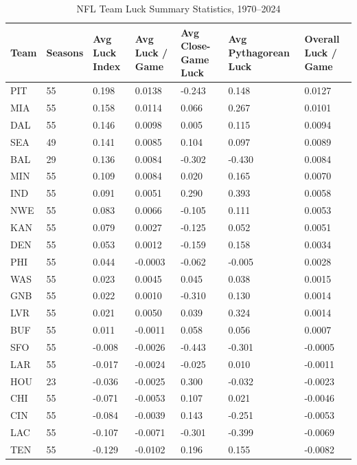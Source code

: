 \documentclass[a4paper,10.5pt,twoside]{article}
\begin{document}
\begin{table}[htbp]
\centering
\caption{NFL Team Luck Summary Statistics, 1970--2024}
\label{tab:luck_summary_stats}
\begin{tabular}{p{1.2cm}p{1.3cm}p{1.8cm}p{1.8cm}p{2.0cm}p{2.2cm}p{1.8cm}}
\hline
\textbf{Team} & \textbf{Seasons} & \textbf{Avg Luck Index} & \textbf{Avg Luck / Game} & \textbf{Avg Close-Game Luck} & \textbf{Avg Pythagorean Luck} & \textbf{Overall Luck / Game} \\
\hline
PIT & 55 & 0.198 & 0.0138 & -0.243 & 0.148 & 0.0127 \\
MIA & 55 & 0.158 & 0.0114 & 0.066 & 0.267 & 0.0101 \\
DAL & 55 & 0.146 & 0.0098 & 0.005 & 0.115 & 0.0094 \\
SEA & 49 & 0.141 & 0.0085 & 0.104 & 0.097 & 0.0089 \\
BAL & 29 & 0.136 & 0.0084 & -0.302 & -0.430 & 0.0084 \\
MIN & 55 & 0.109 & 0.0084 & 0.020 & 0.165 & 0.0070 \\
IND & 55 & 0.091 & 0.0051 & 0.290 & 0.393 & 0.0058 \\
NWE & 55 & 0.083 & 0.0066 & -0.105 & 0.111 & 0.0053 \\
KAN & 55 & 0.079 & 0.0027 & -0.125 & 0.052 & 0.0051 \\
DEN & 55 & 0.053 & 0.0012 & -0.159 & 0.158 & 0.0034 \\
PHI & 55 & 0.044 & -0.0003 & -0.062 & -0.005 & 0.0028 \\
WAS & 55 & 0.023 & 0.0045 & 0.045 & 0.038 & 0.0015 \\
GNB & 55 & 0.022 & 0.0010 & -0.310 & 0.130 & 0.0014 \\
LVR & 55 & 0.021 & 0.0050 & 0.039 & 0.324 & 0.0014 \\
BUF & 55 & 0.011 & -0.0011 & 0.058 & 0.056 & 0.0007 \\
SFO & 55 & -0.008 & -0.0026 & -0.443 & -0.301 & -0.0005 \\
LAR & 55 & -0.017 & -0.0024 & -0.025 & 0.010 & -0.0011 \\
HOU & 23 & -0.036 & -0.0025 & 0.300 & -0.032 & -0.0023 \\
CHI & 55 & -0.071 & -0.0053 & 0.107 & 0.021 & -0.0046 \\
CIN & 55 & -0.084 & -0.0039 & 0.143 & -0.251 & -0.0053 \\
LAC & 55 & -0.107 & -0.0071 & -0.301 & -0.399 & -0.0069 \\
TEN & 55 & -0.129 & -0.0102 & 0.196 & 0.155 & -0.0082 \\

\end{tabular}
\end{table}
\end{document}
